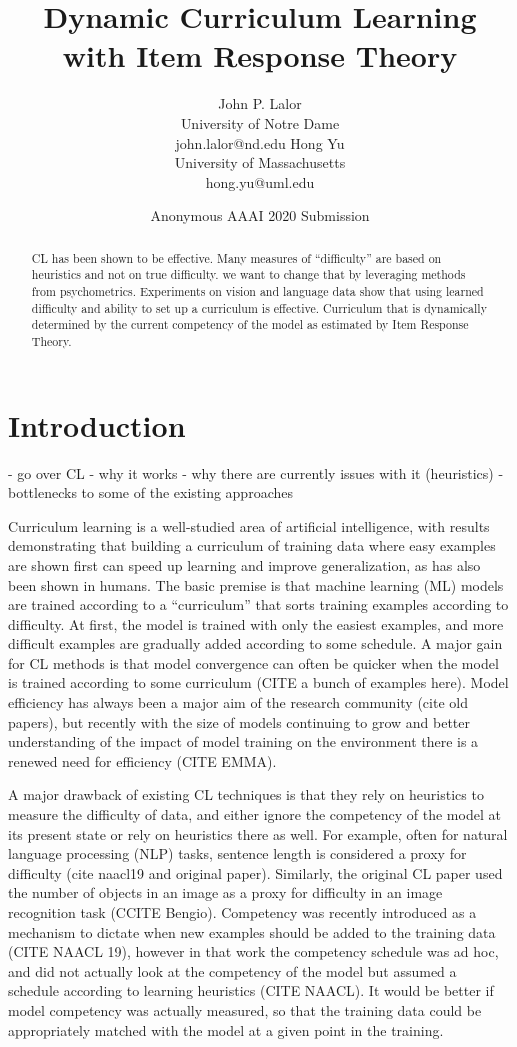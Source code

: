 \documentclass[letterpaper]{article} %
\title{Dynamic Curriculum Learning with Item Response Theory}
\author{
	John P. Lalor \\
	University of Notre Dame \\
	john.lalor@nd.edu
	\And 
	Hong Yu \\
	University of Massachusetts \\
	hong.yu@uml.edu
}
\author{
	Anonymous AAAI 2020 Submission
}
\begin{document}
\maketitle 
\begin{abstract}
CL has been shown to be effective.
Many measures of ``difficulty'' are based on heuristics and not on true difficulty.
we want to change that by leveraging methods from psychometrics.
Experiments on vision and language data show that using learned difficulty and ability to set up a curriculum is effective.
Curriculum that is dynamically determined by the current competency of the model as estimated by Item Response Theory. 
\end{abstract}

\section{Introduction}
- go over CL
- why it works
- why there are currently issues with it (heuristics)
- bottlenecks to some of the existing approaches

Curriculum learning is a well-studied area of artificial intelligence, with results demonstrating that building a curriculum of training data where easy examples are shown first can speed up learning and improve generalization, as has also been shown in humans. 
The basic premise is that machine learning (ML) models are trained according to a ``curriculum'' that sorts training examples according to difficulty.
At first, the model is trained with only the easiest examples, and more difficult examples are gradually added according to some schedule.
A major gain for CL methods is that model convergence can often be quicker when the model is trained according to some curriculum (CITE a bunch of examples here).
Model efficiency has always been a major aim of the research community (cite old papers), but recently with the size of models continuing to grow and better understanding of the impact of model training on the environment there is a renewed need for efficiency (CITE EMMA).

A major drawback of existing CL techniques is that they rely on heuristics to measure the difficulty of data, and either ignore the competency of the model at its present state or rely on heuristics there as well.
For example, often for natural language processing (NLP) tasks, sentence length is considered a proxy for difficulty (cite naacl19 and original paper).
Similarly, the original CL paper used the number of objects in an image as a proxy for difficulty in an image recognition task (CCITE Bengio).
Competency was recently introduced as a mechanism to dictate when new examples should be added to the training data (CITE NAACL 19), however in that work the competency schedule was ad hoc, and did not actually look at the competency of the model but assumed a schedule according to learning heuristics (CITE NAACL). 
It would be better if model competency was actually measured, so that the training data could be appropriately matched with the model at a given point in the training.
\end{document}
